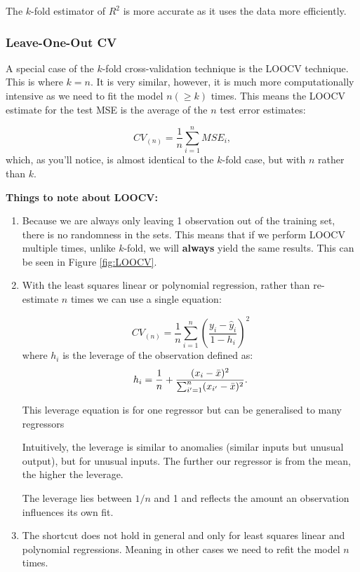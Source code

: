\documentclass[11pt]{article}
\begin{document}
The $k$-fold estimator of $R^2$ is more accurate as it uses the data more efficiently.

\subsubsection{Leave-One-Out CV}

A special case of the $k$-fold cross-validation technique is the LOOCV technique. This is where $k = n$. It is very similar, however, it is much more computationally intensive as we need to fit the model $n (\geq k)$ times. This means the LOOCV estimate for the test MSE is the average of the $n$ test error estimates:

\begin{equation}
    \label{eq:LOOCV}
    CV_{(n)} = \dfrac{1}{n} \sum_{i=1}^n MSE_i,
\end{equation}
which, as you'll notice, is almost identical to the $k$-fold case, but with $n$ rather than $k$.

\begin{shaded}
    \textbf{Things to note about LOOCV:}
    \begin{enumerate}
        \item Because we are always only leaving 1 observation out of the training set, there is no randomness in the sets. This means that if we perform LOOCV multiple times, unlike $k$-fold, we will \textbf{always} yield the same results. This can be seen in Figure \ref{fig:LOOCV}.
        \item With the least squares linear or polynomial regression, rather than re-estimate $n$ times we can use a single equation:

        \begin{equation}
            \label{eq:LOOCV shortcut}
            CV_{(n)} = \dfrac{1}{n}\sum_{i=1}^n \left(\dfrac{y_i - \hat{y}_i}{1-h_i}\right)^2
        \end{equation}
        where $h_i$ is the leverage of the observation defined as:
        \begin{equation}
            \label{eq:leverage}
            h_i = \dfrac{1}{n} + \dfrac{(x_i - \Bar{x})^2}{\sum_{i^\prime = 1}^n (x_{i^\prime} - \Bar{x})^2}.
        \end{equation}
        \begin{note}
            This leverage equation is for one regressor but can be generalised to many regressors
        \end{note}
        Intuitively, the leverage is similar to anomalies (similar inputs but unusual output), but for unusual inputs. The further our regressor is from the mean, the higher the leverage.

        The leverage lies between $1/n$ and 1 and reflects the amount an observation influences its own fit.
        \item The shortcut does not hold in general and only for least squares linear and polynomial regressions. Meaning in other cases we need to refit the model $n$ times.
    \end{enumerate}
\end{shaded}
\end{document}
